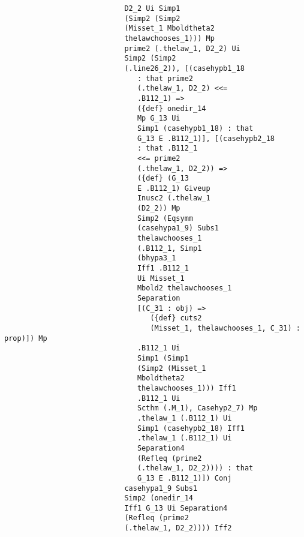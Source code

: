 \documentclass[12pt]{article}
\begin{document}
\begin{verbatim}
                            D2_2 Ui Simp1 
                            (Simp2 (Simp2 
                            (Misset_1 Mboldtheta2 
                            thelawchooses_1))) Mp 
                            prime2 (.thelaw_1, D2_2) Ui 
                            Simp2 (Simp2 
                            (.line26_2)), [(casehypb1_18 
                               : that prime2 
                               (.thelaw_1, D2_2) <<= 
                               .B112_1) => 
                               ({def} onedir_14 
                               Mp G_13 Ui 
                               Simp1 (casehypb1_18) : that 
                               G_13 E .B112_1)], [(casehypb2_18 
                               : that .B112_1 
                               <<= prime2 
                               (.thelaw_1, D2_2)) => 
                               ({def} (G_13 
                               E .B112_1) Giveup 
                               Inusc2 (.thelaw_1 
                               (D2_2)) Mp 
                               Simp2 (Eqsymm 
                               (casehypa1_9) Subs1 
                               thelawchooses_1 
                               (.B112_1, Simp1 
                               (bhypa3_1 
                               Iff1 .B112_1 
                               Ui Misset_1 
                               Mbold2 thelawchooses_1 
                               Separation 
                               [(C_31 : obj) => 
                                  ({def} cuts2 
                                  (Misset_1, thelawchooses_1, C_31) : prop)]) Mp 
                               .B112_1 Ui 
                               Simp1 (Simp1 
                               (Simp2 (Misset_1 
                               Mboldtheta2 
                               thelawchooses_1))) Iff1 
                               .B112_1 Ui 
                               Scthm (.M_1), Casehyp2_7) Mp 
                               .thelaw_1 (.B112_1) Ui 
                               Simp1 (casehypb2_18) Iff1 
                               .thelaw_1 (.B112_1) Ui 
                               Separation4 
                               (Refleq (prime2 
                               (.thelaw_1, D2_2)))) : that 
                               G_13 E .B112_1)]) Conj 
                            casehypa1_9 Subs1 
                            Simp2 (onedir_14 
                            Iff1 G_13 Ui Separation4 
                            (Refleq (prime2 
                            (.thelaw_1, D2_2)))) Iff2 

\end{verbatim}
\end{document}
